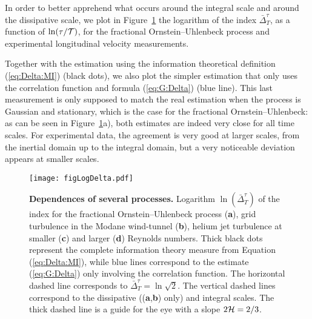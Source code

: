 \documentclass[aps,pra,groupedaddress,notitlepage]{revtex4-1}
\begin{document}
In order to better apprehend what occurs around the integral scale and around the dissipative scale, we plot in Figure~\ref{fig:All} the logarithm of the index $\bar{\Delta}_T^{\tau}$, as a function of $\ln(\tau/\cal{T})$, for the fractional  Ornstein--Uhlenbeck process and experimental longitudinal velocity measurements.



Together with the estimation using the information theoretical definition (\ref{eq:Delta:MI}) (black dots), we also plot the simpler estimation that  only uses the correlation function and formula (\ref{eq:G:Delta}) (blue line). This last measurement is only supposed to match the real estimation when the process is Gaussian and stationary, which is the case for the fractional  Ornstein--Uhlenbeck: as can be seen in Figure~\ref{fig:All}a), both estimates are indeed very close for all time scales.
For experimental data, the agreement is very good at larger scales, from the inertial domain up to the integral domain, but a very noticeable deviation appears at smaller scales. 


\begin{figure}[htb]
\texttt{[image: figLogDelta.pdf]}
\caption{{\bf Dependences of several processes.} 
Logarithm $\ln\left( \bar{\Delta}_T^{\tau} \right)$ of the index for the fractional Ornstein--Uhlenbeck process (\textbf{a}), grid turbulence in the Modane wind-tunnel (\textbf{b}), helium jet turbulence at smaller (\textbf{c}) and larger (\textbf{d}) Reynolds numbers.
{Thick black dots represent the complete information theory measure from Equation (\ref{eq:Delta:MI}), while blue lines correspond to the estimate (\ref{eq:G:Delta}) only involving the correlation function}. 
The horizontal dashed line corresponds to $\bar{\Delta}_T^{\tau}=\ln\sqrt{2}$.
The vertical dashed lines correspond to the dissipative ((\textbf{a},\textbf{b}) only) and integral scales.
The thick dashed line is a guide for the eye with a slope $2{\cal H}=2/3$.}
\label{fig:All}
\end{figure}
\end{document}
